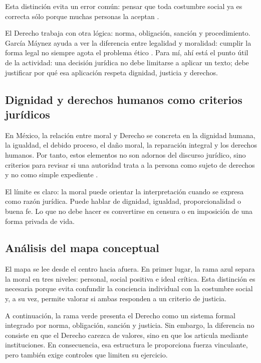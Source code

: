 \documentclass[
	spanish,
	letterpaper, oneside
]{article}
\begin{document}
Esta distinción evita un error común: pensar que toda costumbre social ya es correcta sólo porque muchas personas la aceptan \citep{ronquilloarmasEticaGeneralProfesional2018,singerCompendioEtica1995}.

El Derecho trabaja con otra lógica: norma, obligación, sanción y procedimiento. García Máynez ayuda a ver la diferencia entre legalidad y moralidad: cumplir la forma legal no siempre agota el problema ético \citep{garciaMaynezEtica}. Para mí, ahí está el punto útil de la actividad: una decisión jurídica no debe limitarse a aplicar un texto; debe justificar por qué esa aplicación respeta dignidad, justicia y derechos.

\subsection{Dignidad y derechos humanos como criterios jurídicos}

En México, la relación entre moral y Derecho se concreta en la dignidad humana, la igualdad, el debido proceso, el daño moral, la reparación integral y los derechos humanos. Por tanto, estos elementos no son adornos del discurso jurídico, sino criterios para revisar si una autoridad trata a la persona como sujeto de derechos y no como simple expediente \citep{cndhMarcoNormativo2026}.

El límite es claro: la moral puede orientar la interpretación cuando se expresa como razón jurídica. Puede hablar de dignidad, igualdad, proporcionalidad o buena fe. Lo que no debe hacer es convertirse en censura o en imposición de una forma privada de vida.

\subsection{Análisis del mapa conceptual}

El mapa se lee desde el centro hacia afuera. En primer lugar, la rama azul separa la moral en tres niveles: personal, social positiva e ideal crítica. Esta distinción es necesaria porque evita confundir la conciencia individual con la costumbre social y, a su vez, permite valorar si ambas responden a un criterio de justicia.

A continuación, la rama verde presenta el Derecho como un sistema formal integrado por norma, obligación, sanción y justicia. Sin embargo, la diferencia no consiste en que el Derecho carezca de valores, sino en que los articula mediante instituciones. En consecuencia, esa estructura le proporciona fuerza vinculante, pero también exige controles que limiten su ejercicio.
\end{document}
